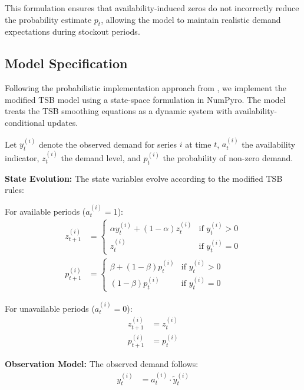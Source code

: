\documentclass[11pt]{amsart}
\theoremstyle{definition}
\begin{document}
This formulation ensures that availability-induced zeros do not incorrectly reduce the probability estimate $p_t$, 
allowing the model to maintain realistic demand expectations during stockout periods.

\subsection{Model Specification}

Following the probabilistic implementation approach from \cite{orduz2023tsb_numpyro}, we implement the modified TSB model 
using a state-space formulation in NumPyro. The model treats the TSB smoothing equations as a dynamic system with 
availability-conditional updates.

Let $y_t^{(i)}$ denote the observed demand for series $i$ at time $t$, $a_t^{(i)}$ the availability indicator, 
$z_t^{(i)}$ the demand level, and $p_t^{(i)}$ the probability of non-zero demand.

\textbf{State Evolution:} The state variables evolve according to the modified TSB rules:

For available periods ($a_t^{(i)} = 1$):
\begin{align}
z_{t+1}^{(i)} &= \begin{cases}
\alpha y_t^{(i)} + (1-\alpha) z_t^{(i)} & \text{if } y_t^{(i)} > 0 \\
z_t^{(i)} & \text{if } y_t^{(i)} = 0
\end{cases} \label{eq:state_z_available} \\
p_{t+1}^{(i)} &= \begin{cases}
\beta + (1-\beta) p_t^{(i)} & \text{if } y_t^{(i)} > 0 \\
(1-\beta) p_t^{(i)} & \text{if } y_t^{(i)} = 0
\end{cases} \label{eq:state_p_available}
\end{align}

For unavailable periods ($a_t^{(i)} = 0$):
\begin{align}
z_{t+1}^{(i)} &= z_t^{(i)} \label{eq:state_z_unavailable} \\
p_{t+1}^{(i)} &= p_t^{(i)} \label{eq:state_p_unavailable}
\end{align}

\textbf{Observation Model:} The observed demand follows:
\begin{align}
y_t^{(i)} &= a_t^{(i)} \cdot \tilde{y}_t^{(i)} \label{eq:obs_model}
\end{align}
\end{document}
